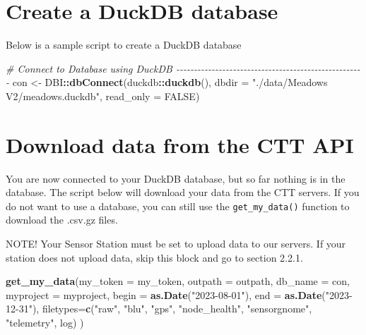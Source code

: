 \documentclass[
]{book}
\newenvironment{Shaded}{\begin{snugshade}}{\end{snugshade}}
\newcommand{\AttributeTok}[1]{\textcolor[rgb]{0.13,0.29,0.53}{#1}}
\newcommand{\CommentTok}[1]{\textcolor[rgb]{0.56,0.35,0.01}{\textit{#1}}}
\newcommand{\ConstantTok}[1]{\textcolor[rgb]{0.56,0.35,0.01}{#1}}
\newcommand{\FunctionTok}[1]{\textcolor[rgb]{0.13,0.29,0.53}{\textbf{#1}}}
\newcommand{\NormalTok}[1]{#1}
\newcommand{\OtherTok}[1]{\textcolor[rgb]{0.56,0.35,0.01}{#1}}
\newcommand{\SpecialCharTok}[1]{\textcolor[rgb]{0.81,0.36,0.00}{\textbf{#1}}}
\newcommand{\StringTok}[1]{\textcolor[rgb]{0.31,0.60,0.02}{#1}}
\begin{document}
\section{Create a DuckDB database}\label{create-a-duckdb-database}

Below is a sample script to create a DuckDB database

\begin{Shaded}
\begin{Highlighting}[]
\CommentTok{\# Connect to Database using DuckDB {-}{-}{-}{-}{-}{-}{-}{-}{-}{-}{-}{-}{-}{-}{-}{-}{-}{-}{-}{-}{-}{-}{-}{-}{-}{-}{-}{-}{-}{-}{-}{-}{-}{-}{-}{-}{-}{-}{-}{-}{-}{-}{-}{-}{-}{-}{-}{-}{-}{-}{-}{-}{-}}
\NormalTok{con }\OtherTok{\textless{}{-}}\NormalTok{ DBI}\SpecialCharTok{::}\FunctionTok{dbConnect}\NormalTok{(duckdb}\SpecialCharTok{::}\FunctionTok{duckdb}\NormalTok{(), }
                      \AttributeTok{dbdir =} \StringTok{"./data/Meadows V2/meadows.duckdb"}\NormalTok{, }
                      \AttributeTok{read\_only =} \ConstantTok{FALSE}\NormalTok{)}
\end{Highlighting}
\end{Shaded}

\section{Download data from the CTT API}\label{download-data-from-the-ctt-api}

You are now connected to your DuckDB database, but so far nothing is in the database. The script below will download your data from the CTT servers. If you do not want to use a database, you can still use the \texttt{get\_my\_data()} function to download the .csv.gz files.

NOTE! Your Sensor Station must be set to upload data to our servers. If your station does not upload data, skip this block and go to section 2.2.1.

\begin{Shaded}
\begin{Highlighting}[]
\FunctionTok{get\_my\_data}\NormalTok{(}\AttributeTok{my\_token =}\NormalTok{ my\_token,}
            \AttributeTok{outpath =}\NormalTok{ outpath, }
            \AttributeTok{db\_name =}\NormalTok{ con, }
            \AttributeTok{myproject =}\NormalTok{ myproject,}
            \AttributeTok{begin =} \FunctionTok{as.Date}\NormalTok{(}\StringTok{"2023{-}08{-}01"}\NormalTok{),}
            \AttributeTok{end =} \FunctionTok{as.Date}\NormalTok{(}\StringTok{"2023{-}12{-}31"}\NormalTok{),}
            \AttributeTok{filetypes=}\FunctionTok{c}\NormalTok{(}\StringTok{"raw"}\NormalTok{, }\StringTok{"blu"}\NormalTok{, }\StringTok{"gps"}\NormalTok{, }\StringTok{"node\_health"}\NormalTok{, }\StringTok{"sensorgnome"}\NormalTok{, }\StringTok{"telemetry"}\NormalTok{, }\StringTok{\textquotesingle{}log\textquotesingle{}}\NormalTok{)}
\NormalTok{)}
\end{Highlighting}
\end{Shaded}
\end{document}
